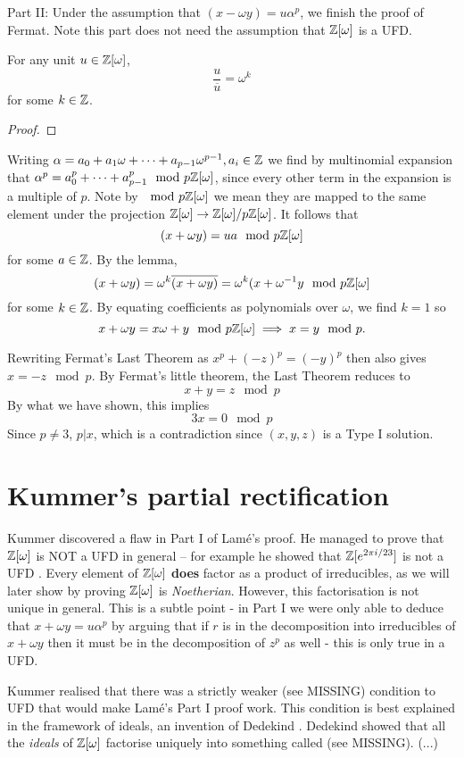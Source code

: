 Part II: Under the assumption that $(x-\omega y)=u\alpha^p$, we finish the proof of Fermat. Note this part does not need the assumption that $\mathbb{Z}[\omega]$ is a UFD. 

\begin{lemma}
For any unit $u\in \mathbb{Z}[\omega]$, $$\frac{u}{\overline{u}}=\omega^k$$ for some $k\in \mathbb{Z}$. 
\end{lemma}
\begin{proof}

\end{proof}

Writing $\alpha=a_0+a_1\omega+\dots+a_{p-1}\omega^{p-1}, a_i\in \mathbb{Z}$ we find by multinomial expansion that $\alpha^p=a_0^p+\dots+a_{p-1}^p \mod p\mathbb{Z}[\omega]$, since every other term in the expansion is a multiple of $p$. Note by $\mod p\mathbb{Z}[\omega]$ we mean they are mapped to the same element under the projection $\mathbb{Z}[\omega]\rightarrow \mathbb{Z}[\omega]/p\mathbb{Z}[\omega]$. It follows that $$(x+\omega y)=ua\mod p\mathbb{Z}[\omega]$$ for some $a\in \mathbb{Z}$. By the lemma, $$(x+\omega y)=\omega^k\overline{(x+\omega y)}=\omega^k(x+\omega^{-1}y \mod p\mathbb{Z}[\omega]$$ for some $k\in \mathbb{Z}$. By equating coefficients as polynomials over $\omega$, we find $k=1$ so
$$x+\omega y=x\omega+y \mod p\mathbb{Z}[\omega] \implies x=y\mod p.$$

Rewriting Fermat's Last Theorem as $x^p+(-z)^p=(-y)^p$ then also gives $x=-z\mod p$. By Fermat's little theorem, the Last Theorem reduces to
$$x+y=z\mod p$$
By what we have shown, this implies
$$3x=0\mod p$$
Since $p\neq 3$, $p|x$, which is a contradiction since $(x,y,z)$ is a Type I solution.


\section{Kummer's partial rectification}
Kummer discovered a flaw in Part I of Lamé's proof. He managed to prove that $\mathbb{Z}[\omega]$ is NOT a UFD in general -- for example he showed that $\mathbb{Z}[e^{2\pi i/23}]$ is not a UFD \cite{Wright}. Every element of $\mathbb{Z}[\omega]$ \textbf{does} factor as a product of irreducibles, as we will later show by proving $\mathbb{Z}[\omega]$ is \textit{Noetherian}. However, this factorisation is not unique in general. This is a subtle point - in Part I we were only able to deduce that $x+\omega y=u\alpha^p$ by arguing that if $r$ is in the decomposition into irreducibles of $x+\omega y$ then it must be in the decomposition of $z^p$ as well - this is only true in a UFD.

Kummer realised that there was a strictly weaker (see MISSING) condition to UFD that would make Lamé's Part I proof work. This condition is best explained in the framework of ideals, an invention of Dedekind \cite{Wright}. Dedekind showed that all the \textit{ideals} of $\mathbb{Z}[\omega]$ factorise uniquely into something called  (see MISSING). (...)


